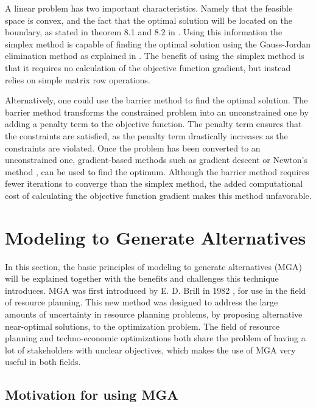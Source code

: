A linear problem has two important characteristics. Namely that the feasible space is convex, and the fact that the optimal solution will be located on the boundary, as stated in theorem 8.1 and 8.2 in \cite{OpimizationIntroduction}. Using this information the simplex method is capable of finding the optimal solution using the Gauss-Jordan elimination method as explained in \cite{OpimizationIntroduction}. The benefit of using the simplex method is that it requires no calculation of the objective function gradient, but instead relies on simple matrix row operations. 

Alternatively, one could use the barrier method to find the optimal solution. The barrier method transforms the constrained problem into an unconstrained one by adding a penalty term to the objective function. The penalty term ensures that the constraints are satisfied, as the penalty term drastically increases as the constraints are violated. Once the problem has been converted to an unconstrained one, gradient-based methods such as gradient descent or Newton's method \cite{OpimizationIntroduction}, can be used to find the optimum. Although the barrier method requires fewer iterations to converge than the simplex method, the added computational cost of calculating the objective function gradient makes this method unfavorable. 


\section{Modeling to Generate Alternatives}\label{sec:MGA}
In this section, the basic principles of modeling to generate alternatives (MGA) will be explained together with the benefits and challenges this technique introduces. MGA was first introduced by E. D. Brill in 1982 \cite{Brill_MGA_1982}, for use in the field of resource planning. This new method was designed to address the large amounts of uncertainty in resource planning problems, by proposing alternative near-optimal solutions, to the optimization problem. 
The field of resource planning and techno-economic optimizations both share the problem of having a lot of stakeholders with unclear objectives, which makes the use of MGA very useful in both fields. 

\subsection{Motivation for using MGA}

